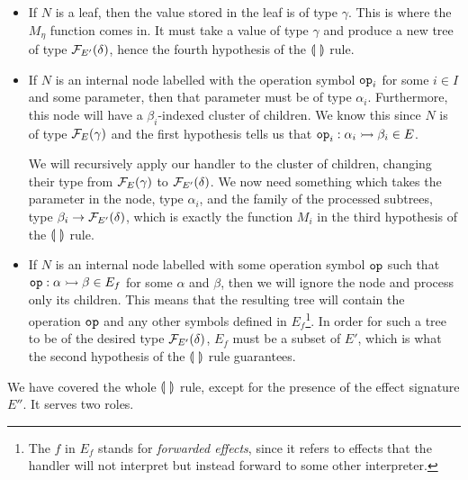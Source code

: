 \begin{itemize}
\item If $N$ is a leaf, then the value stored in the leaf is of type
  $\gamma$. This is where the $M_\eta$ function comes in. It must take a
  value of type $\gamma$ and produce a new tree of type $\mathcal{F}_{E'}(\delta)$,
  hence the fourth hypothesis of the $\llparenthesis \,  \, \rrparenthesis$ rule.

\item If $N$ is an internal node labelled with the operation symbol
  $\mathtt{op}_i$ for some $i \in I$ and some parameter, then that parameter
  must be of type $\alpha_i$. Furthermore, this node will have a
  $\beta_i$-indexed cluster of children. We know this since $N$ is of type
  $\mathcal{F}_E(\gamma)$ and the first hypothesis tells us that
  $\mathtt{op}_i : \alpha_i \rightarrowtail \beta_i \in E$.

  We will recursively apply our handler to the cluster of children,
  changing their type from $\mathcal{F}_E(\gamma)$ to $\mathcal{F}_{E'}(\delta)$. We now
  need something which takes the parameter in the node, type $\alpha_i$,
  and the family of the processed subtrees, type $\beta_i \to
  \mathcal{F}_{E'}(\delta)$, which is exactly the function $M_i$ in the third
  hypothesis of the $\llparenthesis \,  \, \rrparenthesis$ rule.

\item If $N$ is an internal node labelled with some operation symbol
  $\mathtt{op}$ such that $\mathtt{op} : \alpha \rightarrowtail \beta \in E_f$ for some
  $\alpha$ and $\beta$, then we will ignore the node and process only its
  children. This means that the resulting tree will contain the operation
  $\mathtt{op}$ and any other symbols defined in $E_f$\footnote{The $f$ in
    $E_f$ stands for \emph{forwarded effects}, since it refers to effects
    that the handler will not interpret but instead forward to some other
    interpreter.}. In order for such a tree to be of the desired type
  $\mathcal{F}_{E'}(\delta)$, $E_f$ must be a subset of $E'$, which is what the
  second hypothesis of the $\llparenthesis \,  \, \rrparenthesis$ rule guarantees.
\end{itemize}

We have covered the whole $\llparenthesis \,  \, \rrparenthesis$ rule, except for the presence of the
effect signature $E''$. It serves two roles.

